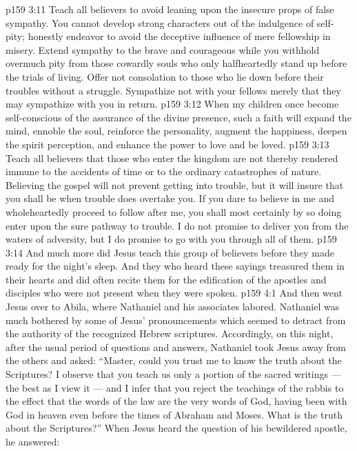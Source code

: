 \vs p159 3:11 Teach all believers to avoid leaning upon the insecure props of false sympathy. You cannot develop strong characters out of the indulgence of self\hyp{}pity; honestly endeavor to avoid the deceptive influence of mere fellowship in misery. Extend sympathy to the brave and courageous while you withhold overmuch pity from those cowardly souls who only halfheartedly stand up before the trials of living. Offer not consolation to those who lie down before their troubles without a struggle. Sympathize not with your fellows merely that they may sympathize with you in return.
\vs p159 3:12 \pc When my children once become self\hyp{}conscious of the assurance of the divine presence, such a faith will expand the mind, ennoble the soul, reinforce the personality, augment the happiness, deepen the spirit perception, and enhance the power to love and be loved.
\vs p159 3:13 Teach all believers that those who enter the kingdom are not thereby rendered immune to the accidents of time or to the ordinary catastrophes of nature. Believing the gospel will not prevent getting into trouble, but it will insure that you shall be  when trouble does overtake you. If you dare to believe in me and wholeheartedly proceed to follow after me, you shall most certainly by so doing enter upon the sure pathway to trouble. I do not promise to deliver you from the waters of adversity, but I do promise to go with you through all of them.
\vs p159 3:14 \pc And much more did Jesus teach this group of believers before they made ready for the night’s sleep. And they who heard these sayings treasured them in their hearts and did often recite them for the edification of the apostles and disciples who were not present when they were spoken.
\vs p159 4:1 And then went Jesus over to Abila, where Nathaniel and his associates labored. Nathaniel was much bothered by some of Jesus’ pronouncements which seemed to detract from the authority of the recognized Hebrew scriptures. Accordingly, on this night, after the usual period of questions and answers, Nathaniel took Jesus away from the others and asked: “Master, could you trust me to know the truth about the Scriptures? I observe that you teach us only a portion of the sacred writings --- the best as I view it --- and I infer that you reject the teachings of the rabbis to the effect that the words of the law are the very words of God, having been with God in heaven even before the times of Abraham and Moses. What is the truth about the Scriptures?” When Jesus heard the question of his bewildered apostle, he answered:
